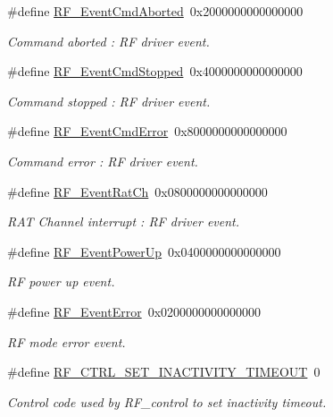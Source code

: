 \begin{DoxyCompactItemize}
\#define \hyperlink{group___r_f___driver___events_ga95a0bf832c19fbdce2c164144ad265ee}{R\+F\+\_\+\+Event\+Cmd\+Aborted}~0x2000000000000000
\begin{DoxyCompactList}\small\item\em Command aborted \+: R\+F driver event. \end{DoxyCompactList}\item 
\#define \hyperlink{group___r_f___driver___events_gac68cfb0f9c26d275ad990f5da9e6b91f}{R\+F\+\_\+\+Event\+Cmd\+Stopped}~0x4000000000000000
\begin{DoxyCompactList}\small\item\em Command stopped \+: R\+F driver event. \end{DoxyCompactList}\item 
\#define \hyperlink{group___r_f___driver___events_ga8255e5773828977cb205fd1f856e710e}{R\+F\+\_\+\+Event\+Cmd\+Error}~0x8000000000000000
\begin{DoxyCompactList}\small\item\em Command error \+: R\+F driver event. \end{DoxyCompactList}\item 
\#define \hyperlink{group___r_f___driver___events_gab0302093e17c587cc4bf2c928c79960e}{R\+F\+\_\+\+Event\+Rat\+Ch}~0x0800000000000000
\begin{DoxyCompactList}\small\item\em R\+A\+T Channel interrupt \+: R\+F driver event. \end{DoxyCompactList}\item 
\#define \hyperlink{group___r_f___driver___events_ga0e6d5e7d3760a65ba37d8f26823e9a0a}{R\+F\+\_\+\+Event\+Power\+Up}~0x0400000000000000
\begin{DoxyCompactList}\small\item\em R\+F power up event. \end{DoxyCompactList}\item 
\#define \hyperlink{group___r_f___driver___events_gaa6b858b8b383210049fa3f17dcd95fac}{R\+F\+\_\+\+Event\+Error}~0x0200000000000000
\begin{DoxyCompactList}\small\item\em R\+F mode error event. \end{DoxyCompactList}\item 
\#define \hyperlink{group___r_f___c_t_r_l_ga24096530a8da4bde84275bc9c76b2cee}{R\+F\+\_\+\+C\+T\+R\+L\+\_\+\+S\+E\+T\+\_\+\+I\+N\+A\+C\+T\+I\+V\+I\+T\+Y\+\_\+\+T\+I\+M\+E\+O\+U\+T}~0
\begin{DoxyCompactList}\small\item\em Control code used by R\+F\+\_\+control to set inactivity timeout. \end{DoxyCompactList}\end{DoxyCompactItemize}
